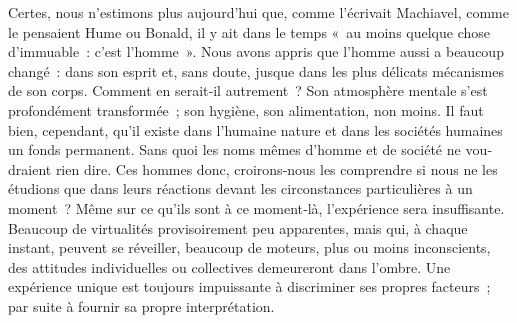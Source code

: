 \documentclass[french,twoside]{book} %
\begin{document}
Certes, nous n’estimons plus aujourd’hui que, comme l’écrivait Ma­chiavel, comme le pensaient Hume ou Bonald, il y ait dans le temps « au moins quelque chose d’immuable : c’est l’homme ». Nous avons appris que l’homme aussi a beaucoup changé : dans son esprit et, sans doute, jusque dans les plus délicats mécanismes de son corps. Comment en serait‑il autrement ? Son atmosphère mentale s’est profondément transformée ; son hygiène, son alimentation, non moins. Il faut bien, cependant, qu’il existe dans l’humaine nature et dans les sociétés humaines un fonds permanent. Sans quoi les noms mêmes d’homme et de société ne vou­draient rien dire. Ces hommes donc, croirons‑nous les comprendre si nous ne les étudions que dans leurs réactions devant les circonstances particulières à un moment ? Même sur ce qu’ils sont à ce moment‑là, l’expérience sera insuffisante. Beaucoup de virtualités provisoirement peu apparentes, mais qui, à chaque instant, peuvent se réveiller, beaucoup de moteurs, plus ou moins inconscients, des attitudes individuelles ou collectives demeureront dans l’ombre. Une expérience unique est toujours impuissante à discriminer ses propres facteurs ; par suite à fournir sa propre interprétation.
\end{document}
